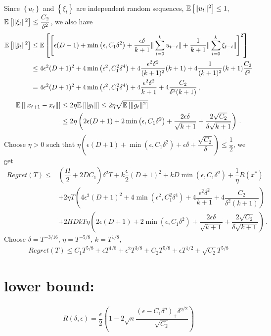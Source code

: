 \documentclass[11pt,letterpaper,english]{article}
\begin{document}
Since $\left\lbrace u_t \right\rbrace$ and $\left\lbrace \xi_t \right\rbrace$ are independent random sequences, $\mathbb{E}\left[\|u_t\|^2\right]\leq 1$, $\mathbb{E}\left[\|\xi_t\|^2\right]\leq \dfrac{C_2}{\delta^2}$, we also have
\begin{align*}
\mathbb{E}\left[ \|\bar{g}_t\|^2 \right] 
&\leq \mathbb{E}\left[ \left[ \epsilon (D+1)+\min\left( \epsilon, C_1\delta^2  \right) +\dfrac{\epsilon \delta}{k+1} \|\sum_{i=0}^k  u_{t-i}  \|+\dfrac{1}{k+1} \|\sum_{i=0}^k \xi_{t-i}  \| \right]^2 \right]\\
&\leq 4\epsilon^2 (D+1)^2+ 4\min\left( \epsilon^2, C_1^2\delta^4 \right)+4 \dfrac{\epsilon^2 \delta^2}{(k+1)^2}(k+1)+4\dfrac{1}{(k+1)^2}(k+1)\dfrac{C_2}{\delta^2}\\
&= 4\epsilon^2 (D+1)^2+ 4\min\left( \epsilon^2, C_1^2\delta^4 \right)+4 \dfrac{\epsilon^2 \delta^2}{k+1}+4\dfrac{C_2}{\delta^2(k+1)} \,,
\end{align*}
\begin{align*}
\mathbb{E}\left[\|x_{t+1}-x_t\|\right] &\leq 2\eta \mathbb{E}\left[\|\bar{g}_t\|\right]
\leq 2\eta \sqrt{\mathbb{E}\left[\|\bar{g}_t\|^2\right]}\\
&\leq 2\eta \left( 2\epsilon (D+1)+2\min\left( \epsilon, C_1\delta^2  \right)+\dfrac{2\epsilon \delta}{\sqrt{k+1}}+\dfrac{2\sqrt{C_2}}{\delta \sqrt{k+1}} \right) \,.
\end{align*}
Choose $\eta >0$ such that $\eta \left( \epsilon (D+1)+\min\left( \epsilon, C_1\delta^2  \right)+\epsilon \delta + \dfrac{\sqrt{C_2}}{\delta} \right) \leq \dfrac{1}{2}$, we get
\begin{align*}
Regret(T) \leq&  (\dfrac{H}{2}+2D C_1)\delta^2 T+k\dfrac{\epsilon}{2}(D+1)^2+kD\min\left( \epsilon, C_1\delta^2   \right)+\dfrac{1}{\eta} R(x^*) \\
&+ 2\eta T \left( 4\epsilon^2 (D+1)^2+ 4\min\left( \epsilon^2, C_1^2\delta^4 \right)+4 \dfrac{\epsilon^2 \delta^2}{k+1}+4\dfrac{C_2}{\delta^2(k+1)} \right)\\
&+ 2HD kT \eta \left( 2\epsilon (D+1)+2\min\left( \epsilon, C_1\delta^2  \right)+\dfrac{2\epsilon \delta}{\sqrt{k+1}}+\dfrac{2\sqrt{C_2}}{\delta \sqrt{k+1}} \right)\,.
\end{align*}
Choose $\delta = T^{-3/16}$, $\eta = T^{-5/8}$, $k=T^{1/8}$, 
\begin{align*}
Regret(T) \leq C_1 T^{5/8} + \epsilon T^{1/8}+\epsilon^2 T^{3/8} +C_2 T^{5/8}+\epsilon T^{1/2} +\sqrt{C_2}T^{5/8}
\end{align*}

\section*{lower bound:}
\begin{align*}
R(\delta, \epsilon) = \dfrac{\epsilon}{2} \left(1 - 2 \sqrt{n}  \dfrac{(\epsilon-C_1\delta^p)_+\delta^{q/2}}{\sqrt{C_2}}\right)
\end{align*}
\end{document}
